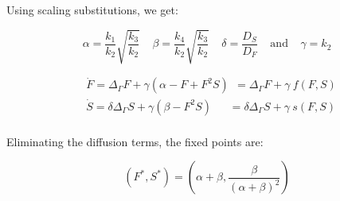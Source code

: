 \documentclass{beamer}
\begin{document}
            \begin{frame}{\insertsubsectionhead}
                
                Using scaling substitutions, we get:
                
                $$\alpha = \frac{k_1}{k_2}\sqrt{\frac{k_3}{k_2}} ~~~~~ \beta = \frac{k_4}{k_2}\sqrt{\frac{k_3}{k_2}} ~~~~~ \delta = \frac{D_S}{D_F} ~~~~~ \text{and} ~~~~~ \gamma = k_2 $$ 
                
                \vfill
                
                \begin{equation*}
                    \begin{aligned}
                        & \dot{F} = \Delta_\Gamma F + 
                        \gamma\left(\alpha - F + F^2S\right) ~~=  \Delta_\Gamma F + \gamma ~ f(F,S)\\
                        & \dot{S} = \delta\Delta_\Gamma S + 
                        \gamma\left(\beta - F^2S\right)~~~~~~~ = \delta\Delta_\Gamma S + \gamma ~ s(F,S)\\
                    \end{aligned}
                \end{equation*}
                
                \vfill
                
                Eliminating the diffusion terms, the fixed points are:
                
                \vfill
                
                $$(F^*,S^*)=\left(\alpha+\beta,\frac{\beta}{(\alpha+\beta)^2}\right)$$
                
                \vfill
            
            \end{frame}
            
\end{document}

